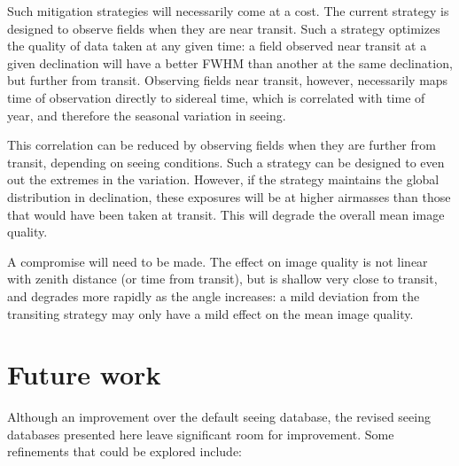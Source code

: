 \documentclass[DM,authoryear,toc]{lsstdoc}
\begin{document}
Such mitigation strategies will necessarily come at a cost. The
current strategy is designed to observe fields when they are near
transit. Such a strategy optimizes the quality of data taken at any
given time: a field observed near transit at a given declination will
have a better FWHM than another at the same declination, but further
from transit. Observing fields near transit, however, necessarily maps
time of observation directly to sidereal time, which is correlated
with time of year, and therefore the seasonal variation in seeing.

This correlation can be reduced by observing fields when they are
further from transit, depending on seeing conditions. Such a strategy
can be designed to even out the extremes in the variation. However, if
the strategy maintains the global distribution in declination, these
exposures will be at higher airmasses than those that would have been
taken at transit. This will degrade the overall mean image quality.

A compromise will need to be made. The effect on image quality is not
linear with zenith distance (or time from transit), but is shallow
very close to transit, and degrades more rapidly as the angle
increases: a mild deviation from the transiting strategy may only have
a mild effect on the mean image quality.

\section{Future work}
\label{sec:future}

Although an improvement over the default seeing database, the revised
seeing databases presented here leave significant room for
improvement. Some refinements that could be explored include:
\end{document}
